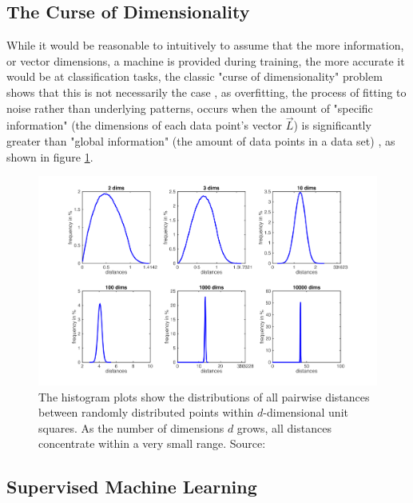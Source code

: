 \subsection{The Curse of Dimensionality}\label{sec:curse_of_dimensionality}

While it would be reasonable to intuitively to assume that the more information, or vector dimensions, a machine is provided during training, the more accurate it would be at classification tasks, the classic "curse of dimensionality" problem shows that this is not necessarily the case \cite{jain_1982_39} \cite{friedman_1997_on}, as overfitting, the process of fitting to noise rather than underlying patterns, \cite{overfitting} occurs when the amount of "specific information" (the dimensions of each data point's vector $\vec{L}$) is significantly greater than "global information" (the amount of data points in a data set) \cite{overfitting} \cite{liu_2016_overfitting}, as shown in figure \ref{fig:curse_dim}. 

\begin{figure}
    \centering
    \includegraphics[width=\linewidth]{images/cursefigure.png}
    \caption{The histogram plots show the distributions of all pairwise distances between randomly distributed points within $d$-dimensional unit squares. As the number of dimensions $d$ grows, all distances concentrate within a very small range. Source: \cite{cornell_curse_notes}
}
    \label{fig:curse_dim}
\end{figure}

\subsection{Supervised Machine Learning}\label{sec:supervised_ml}

